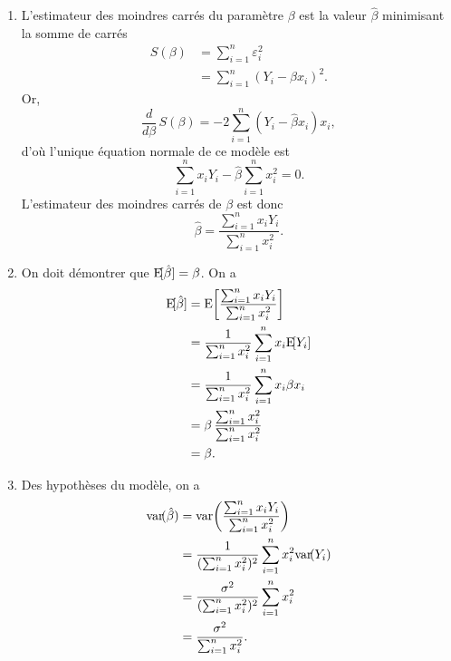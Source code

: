 \begin{solution}{2.6}
    \begin{enumerate}
    \item L'estimateur des moindres carrés du paramètre $\beta$ est la
      valeur $\hat{\beta}$ minimisant la somme de carrés
      \begin{align*}
        S(\beta)
        &=\sum_{i = 1}^n \varepsilon_i^2 \\
        &=\sum_{i = 1}^n (Y_i - \beta x_i)^2.
      \end{align*}
      Or,
      \begin{displaymath}
        \frac{d}{d \beta}\, S(\beta) = -2 \sum_{i = 1}^n (Y_i -
        \hat{\beta} x_i) x_i,
      \end{displaymath}
      d'où l'unique équation normale de ce modèle est
      \begin{displaymath}
        \sum_{i = 1}^n x_i Y_i - \hat{\beta} \sum_{i=1}^n x_i^2 = 0.
      \end{displaymath}
      L'estimateur des moindres carrés de $\beta$ est donc
      \begin{displaymath}
        \hat{\beta} = \frac{\sum_{i=1}^n x_i Y_i}{\sum_{i=1}^n x_i^2}.
      \end{displaymath}
    \item On doit démontrer que $\mathrm{E}\! [ \hat{\beta} ] = \beta$. On a
      \begin{align*}
        \mathrm{E}\! [ \hat{\beta} ]
        &= \mathrm{E}\! \left[ \frac{\sum_{i=1}^n x_i Y_i}{\sum_{i=1}^n x_i^2} \right] \\
        &= \frac{1}{\sum_{i=1}^n x_i^2} \sum_{i=1}^n x_i \mathrm{E}\! [ Y_i ] \\
        &= \frac{1}{\sum_{i=1}^nx_i^2} \sum_{i=1}^n x_i \beta x_i \\
        &= \beta\, \frac{\sum_{i=1}^n x_i^2}{\sum_{i=1}^n x_i^2} \\
        &= \beta.
      \end{align*}
    \item Des hypothèses du modèle, on a
      \begin{align*}
        \mathrm{var}\! ( \hat{\beta} )
        &= \mathrm{var}\! \left( \frac{\sum_{i=1}^n x_i Y_i}{\sum_{i=1}^n x_i^2} \right) \\
        &= \frac{1}{(\sum_{i=1}^n x_i^2)^2} \sum_{i=1}^n x_i^2 \mathrm{var}\! ( Y_i ) \\
        &= \frac{\sigma^2}{(\sum_{i=1}^n x_i^2)^2} \sum_{i=1}^n x_i^2 \\
        &= \frac{\sigma^2}{\sum_{i=1}^n x_i^2}.
      \end{align*}
    \end{enumerate}
  
\end{solution}
